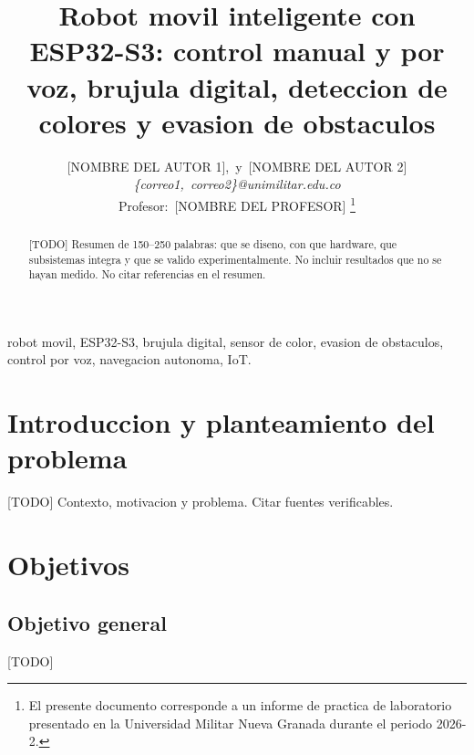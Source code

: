 \documentclass[journal]{IEEEtran}
\begin{document}
\title{Robot movil inteligente con ESP32-S3: control manual y por voz,
       brujula digital, deteccion de colores y evasion de obstaculos}

\author{[NOMBRE DEL AUTOR 1],~y~[NOMBRE DEL AUTOR 2]\\
        \textit{\{correo1,~correo2\}@unimilitar.edu.co}\\
        Profesor:~[NOMBRE DEL PROFESOR]%
\thanks{El presente documento corresponde a un informe de practica de laboratorio presentado en la Universidad Militar Nueva Granada durante el periodo 2026-2.}}

\maketitle

\begin{abstract}
[TODO] Resumen de 150--250 palabras: que se diseno, con que hardware, que
subsistemas integra y que se valido experimentalmente. No incluir resultados
que no se hayan medido. No citar referencias en el resumen.
\end{abstract}

\begin{IEEEkeywords}
robot movil, ESP32-S3, brujula digital, sensor de color, evasion de obstaculos,
control por voz, navegacion autonoma, IoT.
\end{IEEEkeywords}


\section{Introduccion y planteamiento del problema}
[TODO] Contexto, motivacion y problema. Citar fuentes verificables.

\section{Objetivos}
\subsection{Objetivo general}
[TODO]
\end{document}
